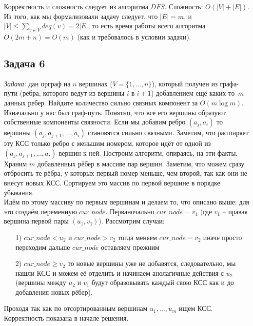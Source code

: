 \documentclass[a4paper,12pt]{article} %
\begin{document}
Корректность и сложность следует из алгоритма $ DFS $. Сложность: $ O(|V| + |E|) $. Из того, как мы формализовали задачу следует, что $ |E| = m $, и $ |V| \leq \sum\limits_{v \in V} deq(v) = 2 |E| $, то есть время работы всего алгоритма $ O(2m + n) = O(m) $ (как и требовалось в условии задачи). 


\subsection*{Задача 6}
\textit{Задача:} дан орграф на $n$ вершинах ($V = \{1,\ldots, n\}$), который получен из графа-пути (рёбра, которого ведут из вершины $i$ в $i+1$) добавлением ещё каких-то~$m$ данных ребер. Найдите количество сильно связных компонент за $O(m\log m)$.\\

Изначально у нас был граф-путь. Понятно, что все его вершины образуют собственные компоненты связности. Если мы добавим ребро $ (a_j, a_i) $ то вершины $ (a_j, a_{j+1}, \ldots, a_i) $ становятся сильно связными. Заметим, что расширяет эту КСС только ребро с меньшим номером, которое идёт от одной из $ (a_j, a_{j+1}, \ldots, a_i) $ вершин к ней. Построим алгоритм, опираясь, на эти факты.\\

Храним $ m $ добавленных рёбер в массиве пар вершин. Заметим, что можем сразу отбросить те рёбра, у которых первый номер меньше, чем второй, так как они не внесут новых КСС. Сортируем это массив по первой вершине в порядке убывания. \\

Идём по этому массиву по первым вершинам и делаем то, что описано выше: для это создаём переменную $cur\_node$. Перваночально $cur\_node = v_1$ (где $ v_1 $ -- правая вершина первой пары $ (u_1, v_1) $). Рассмотрим случаи:
\begin{itemize}
\item[1) ] $cur\_node < u_2$ и $cur\_node > v_2$ тогда меняем $cur\_node = v_2$ иначе просто переходим дальше $cur\_node$ оставляем прежним
\item[2) ] $cur\_node \geqslant v_2$ то новые вершины уже не добавятся, следовательно, мы нашли КСС и можем её отделить и начинаем анолагичные действия с $ u_2 $ (вершины между $ u_2 $ и $ v_1 $ будут образовывать каждый свою КСС как и до добавления новых рёбер).
\end{itemize}

Проходя так как по отсортированным вершинам $ u_1, \ldots, u_m $ ищем КСС. Корректность показана в начале решения.\\
\end{document}
